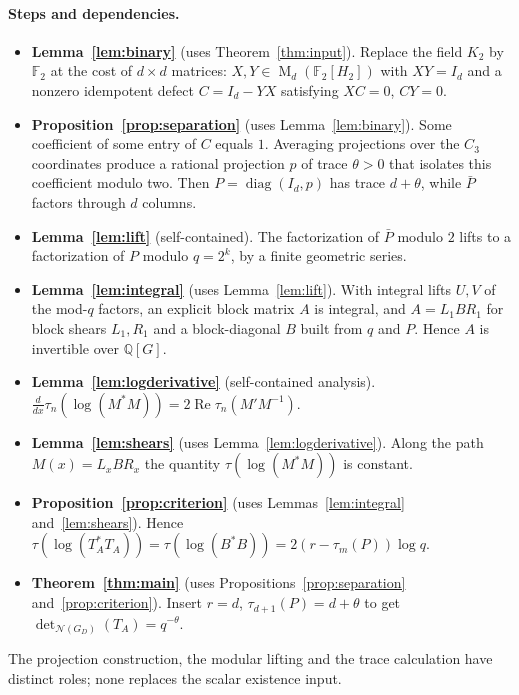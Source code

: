 \documentclass[11pt]{article}
\theoremstyle{remark}
\numberwithin{equation}{section}
\newcommand{\F}{\mathbb F}
\newcommand{\Q}{\mathbb Q}
\newcommand{\Mat}{\operatorname{M}}
\newcommand{\diag}{\operatorname{diag}}
\newcommand{\N}{\mathcal N}
\begin{document}
\paragraph{Steps and dependencies.}
\begin{itemize}[leftmargin=2em]
\item \textbf{Lemma~\ref{lem:binary}} (uses Theorem~\ref{thm:input}). Replace the field $K_2$ by $\F_2$ at the cost of $d\times d$ matrices: $X,Y\in\Mat_d(\F_2[H_2])$ with $XY=I_d$ and a nonzero idempotent defect $C=I_d-YX$ satisfying $XC=0$, $CY=0$.
\item \textbf{Proposition~\ref{prop:separation}} (uses Lemma~\ref{lem:binary}). Some coefficient of some entry of $C$ equals $1$. Averaging projections over the $C_3$ coordinates produce a rational projection $p$ of trace $\theta>0$ that isolates this coefficient modulo two. Then $P=\diag(I_d,p)$ has trace $d+\theta$, while $\bar P$ factors through $d$ columns.
\item \textbf{Lemma~\ref{lem:lift}} (self-contained). The factorization of $\bar P$ modulo $2$ lifts to a factorization of $P$ modulo $q=2^k$, by a finite geometric series.
\item \textbf{Lemma~\ref{lem:integral}} (uses Lemma~\ref{lem:lift}). With integral lifts $U,V$ of the mod-$q$ factors, an explicit block matrix $A$ is integral, and $A=L_1BR_1$ for block shears $L_1,R_1$ and a block-diagonal $B$ built from $q$ and $P$. Hence $A$ is invertible over $\Q[G]$.
\item \textbf{Lemma~\ref{lem:logderivative}} (self-contained analysis). $\frac{d}{dx}\tau_n(\log(M^*M))=2\operatorname{Re}\tau_n(M'M^{-1})$.
\item \textbf{Lemma~\ref{lem:shears}} (uses Lemma~\ref{lem:logderivative}). Along the path $M(x)=L_xBR_x$ the quantity $\tau(\log(M^*M))$ is constant.
\item \textbf{Proposition~\ref{prop:criterion}} (uses Lemmas~\ref{lem:integral} and~\ref{lem:shears}). Hence $\tau(\log(T_A^*T_A))=\tau(\log(B^*B))=2(r-\tau_m(P))\log q$.
\item \textbf{Theorem~\ref{thm:main}} (uses Propositions~\ref{prop:separation} and~\ref{prop:criterion}). Insert $r=d$, $\tau_{d+1}(P)=d+\theta$ to get $\det_{\N(G_D)}(T_A)=q^{-\theta}$.
\end{itemize}
The projection construction, the modular lifting and the trace calculation have distinct roles; none replaces the scalar existence input.
\end{document}
